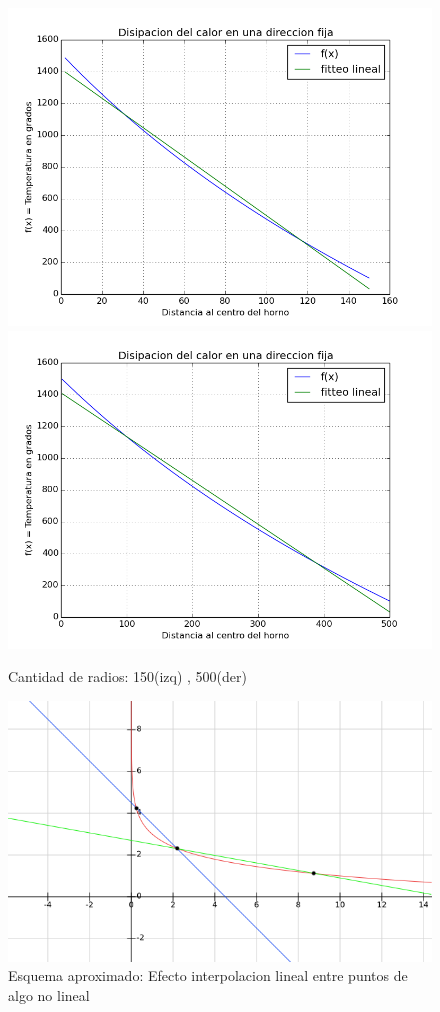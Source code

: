 \begin{figure}[h]
\centering
\includegraphics[scale=0.34]{funcion_temp_150_radios_ti_1500_te_102.png}
\includegraphics[scale=0.34]{funcion_temp_500_radios_ti_1500_te_102.png}
\caption{Cantidad de radios: 150(izq) , 500(der)}
\end{figure}
\FloatBarrier

\begin{figure}[h]
\centering
\includegraphics[scale=0.8]{efecto_interpolacion_lineal.png}
\caption{Esquema aproximado: Efecto interpolacion lineal entre puntos de algo no lineal}
\label{fig:aprox}
\end{figure}
\FloatBarrier

